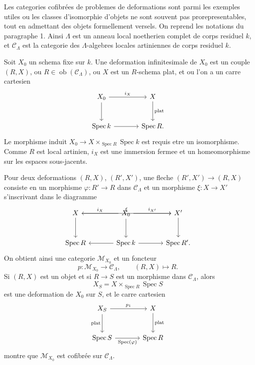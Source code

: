 \documentclass[11pt]{article}
\providecommand{\Spec}{\operatorname{Spec}}
\begin{document}
Les categories cofibrées de problemes de deformations sont parmi les exemples utiles ou les classes d'isomorphie d'objets ne sont souvent pas prorepresentables, tout en admettant des objets formellement versels. On reprend les notations du paragraphe 1. Ainsi \(\Lambda\) est un anneau local noetherien complet de corps residuel \(k\), et \(\mathcal C_\Lambda\) est la categorie des \(\Lambda\)-algebres locales artiniennes de corps residuel \(k\).

Soit \(X_0\) un schema fixe sur \(k\). Une deformation infinitesimale de \(X_0\) est un couple \((R,X)\), ou \(R\in\operatorname{ob}(\mathcal C_\Lambda)\), ou \(X\) est un \(R\)-schema plat, et ou l'on a un carre cartesien
\[
\begin{tikzcd}[column sep=large,row sep=large]
 X_0 \arrow[r,"i_X"] \arrow[d] & X \arrow[d,"\mathrm{plat}"]\\
 \Spec k \arrow[r] & \Spec R .
\end{tikzcd}
\]
Le morphisme induit \(X_0\to X\times_{\Spec R}\Spec k\) est requis etre un isomorphisme. Comme \(R\) est local artinien, \(i_X\) est une immersion fermee et un homeomorphisme sur les espaces sous-jacents.

Pour deux deformations \((R,X)\), \((R',X')\), une fleche \((R',X')\to(R,X)\) consiste en un morphisme \(\varphi:R'\to R\) dans \(\mathcal C_\Lambda\) et un morphisme \(\xi:X\to X'\) s'inscrivant dans le diagramme
\[
\begin{tikzcd}[column sep=large,row sep=large]
 X \arrow[rr,"\xi"] \arrow[d] & X_0 \arrow[l,"i_X"'] \arrow[r,"i_{X'}"] \arrow[d] & X' \arrow[d]\\
 \Spec R & \Spec k \arrow[l] \arrow[r] & \Spec R'.
\end{tikzcd}
\]
On obtient ainsi une categorie \(\mathcal M_{X_0}\) et un foncteur
\[
 p:\mathcal M_{X_0}\to\mathcal C_\Lambda,
 \qquad (R,X)\mapsto R.
\]
Si \((R,X)\) est un objet et si \(R\to S\) est un morphisme dans \(\mathcal C_\Lambda\), alors
\[
 X_S=X\times_{\Spec R}\Spec S
\]
est une deformation de \(X_0\) sur \(S\), et le carre cartesien
\[
\begin{tikzcd}[column sep=large,row sep=large]
 X_S \arrow[r,"p_1"] \arrow[d,"\mathrm{plat}"'] & X \arrow[d,"\mathrm{plat}"]\\
 \Spec S \arrow[r,"\Spec(\varphi)"'] & \Spec R
\end{tikzcd}
\]
montre que \(\mathcal M_{X_0}\) est cofibrée sur \(\mathcal C_\Lambda\).
\end{document}
